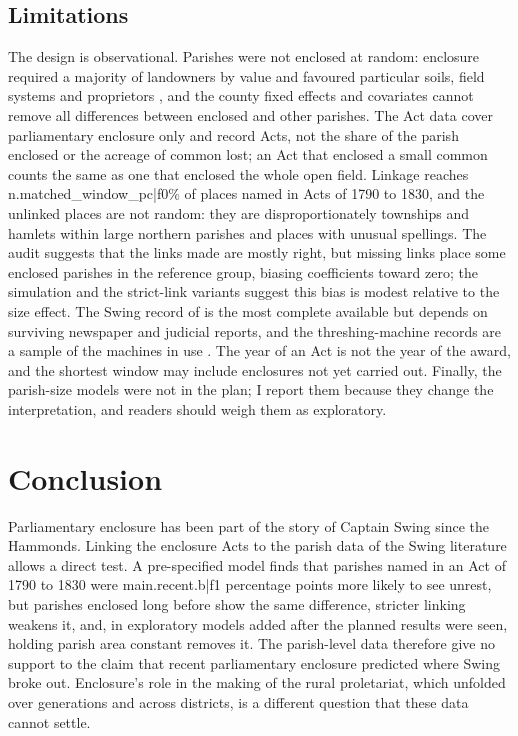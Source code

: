 \documentclass[11pt,a4paper]{article}
\begin{document}
\subsection{Limitations}
The design is observational. Parishes were not enclosed at random: enclosure required a majority of landowners by value and favoured particular soils, field systems and proprietors \citep{turner1980,allen1992}, and the county fixed effects and covariates cannot remove all differences between enclosed and other parishes. The Act data cover parliamentary enclosure only and record Acts, not the share of the parish enclosed or the acreage of common lost; an Act that enclosed a small common counts the same as one that enclosed the whole open field. Linkage reaches {{n.matched_window_pc|f0}}\% of places named in Acts of 1790 to 1830, and the unlinked places are not random: they are disproportionately townships and hamlets within large northern parishes and places with unusual spellings. The audit suggests that the links made are mostly right, but missing links place some enclosed parishes in the reference group, biasing coefficients toward zero; the simulation and the strict-link variants suggest this bias is modest relative to the size effect. The Swing record of \citet{holland2005} is the most complete available but depends on surviving newspaper and judicial reports, and the threshing-machine records are a sample of the machines in use \citep{caprettinivoth2020}. The year of an Act is not the year of the award, and the shortest window may include enclosures not yet carried out. Finally, the parish-size models were not in the plan; I report them because they change the interpretation, and readers should weigh them as exploratory.

\section{Conclusion}
Parliamentary enclosure has been part of the story of Captain Swing since the Hammonds. Linking the enclosure Acts to the parish data of the Swing literature allows a direct test. A pre-specified model finds that parishes named in an Act of 1790 to 1830 were {{main.recent.b|f1}} percentage points more likely to see unrest, but parishes enclosed long before show the same difference, stricter linking weakens it, and, in exploratory models added after the planned results were seen, holding parish area constant removes it. The parish-level data therefore give no support to the claim that recent parliamentary enclosure predicted where Swing broke out. Enclosure's role in the making of the rural proletariat, which unfolded over generations and across districts, is a different question that these data cannot settle.
\end{document}
